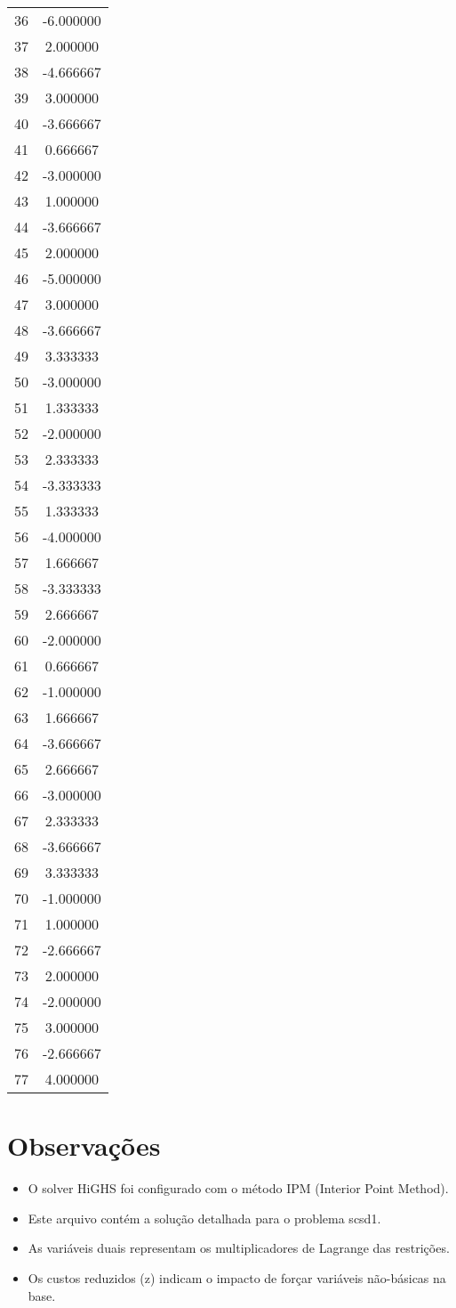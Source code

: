\documentclass[12pt]{article}
\begin{document}
\begin{longtable}{@{}cc@{}}
36 & -6.000000 \\
37 & 2.000000 \\
38 & -4.666667 \\
39 & 3.000000 \\
40 & -3.666667 \\
41 & 0.666667 \\
42 & -3.000000 \\
43 & 1.000000 \\
44 & -3.666667 \\
45 & 2.000000 \\
46 & -5.000000 \\
47 & 3.000000 \\
48 & -3.666667 \\
49 & 3.333333 \\
50 & -3.000000 \\
51 & 1.333333 \\
52 & -2.000000 \\
53 & 2.333333 \\
54 & -3.333333 \\
55 & 1.333333 \\
56 & -4.000000 \\
57 & 1.666667 \\
58 & -3.333333 \\
59 & 2.666667 \\
60 & -2.000000 \\
61 & 0.666667 \\
62 & -1.000000 \\
63 & 1.666667 \\
64 & -3.666667 \\
65 & 2.666667 \\
66 & -3.000000 \\
67 & 2.333333 \\
68 & -3.666667 \\
69 & 3.333333 \\
70 & -1.000000 \\
71 & 1.000000 \\
72 & -2.666667 \\
73 & 2.000000 \\
74 & -2.000000 \\
75 & 3.000000 \\
76 & -2.666667 \\
77 & 4.000000 \\

\end{longtable}


\section{Observações}

\begin{itemize}
\item O solver HiGHS foi configurado com o método IPM (Interior Point Method).
\item Este arquivo contém a solução detalhada para o problema scsd1.
\item As variáveis duais representam os multiplicadores de Lagrange das restrições.
\item Os custos reduzidos (z) indicam o impacto de forçar variáveis não-básicas na base.
\end{itemize}
\end{document}
